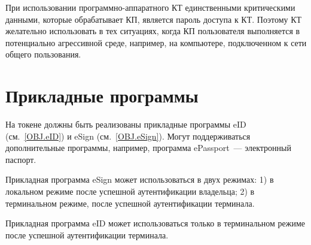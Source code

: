 При использовании программно-аппаратного КТ единственными критическими данными, 
которые обрабатывает КП, является пароль доступа к КТ. Поэтому КТ 
желательно использовать в тех ситуациях, когда КП пользователя 
выполняется в потенциально агрессивной среде, например, 
на компьютере, подключенном к сети общего пользования.

\section{Прикладные программы} 

На токене должны быть реализованы прикладные программы eID (см.~\ref{OBJ.eID}) 
и eSign (см.~\ref{OBJ.eSign}). Могут поддерживаться дополнительные программы, 
например, программа ePassport~--- электронный паспорт. 

Прикладная программа eSign может использоваться в двух режимах:
1) в локальном режиме после успешной аутентификации владельца;
2) в терминальном режиме, после успешной аутентификации терминала.

Прикладная программа eID может использоваться только
в терминальном режиме после успешной аутентификации терминала.